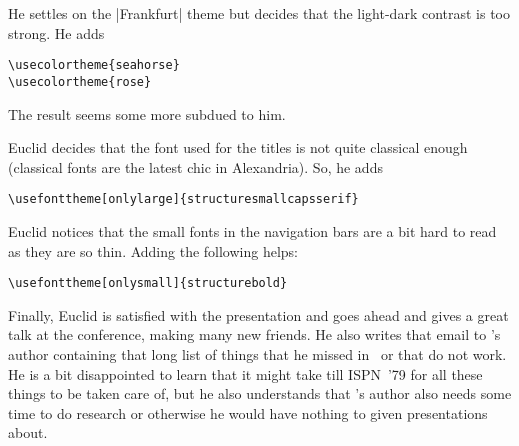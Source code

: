 He settles on the |Frankfurt| theme but decides that the light-dark
contrast is too strong. He adds
\begin{verbatim}
\usecolortheme{seahorse}
\usecolortheme{rose} 
\end{verbatim}  
The result seems some more subdued to him.

Euclid decides that the font used for the titles is not quite
classical enough (classical fonts are the latest chic in
Alexandria). So, he adds
\begin{verbatim}
\usefonttheme[onlylarge]{structuresmallcapsserif}
\end{verbatim}

Euclid notices that the small fonts in the navigation bars
are a bit hard to read as they are so thin. Adding the following
helps:
\begin{verbatim}
\usefonttheme[onlysmall]{structurebold}
\end{verbatim}


Finally, Euclid is satisfied with the presentation and goes ahead and
gives a great talk at the conference, making many new friends. He also
writes that email to \beamer's author containing that long list of
things that he missed in \beamer\ or that do not work. He is a bit
disappointed to learn that it might take till ISPN~'79 for all these
things to be taken care of, but he also understands that \beamer's
author also needs some time to do research or otherwise he would have
nothing to given presentations about.

